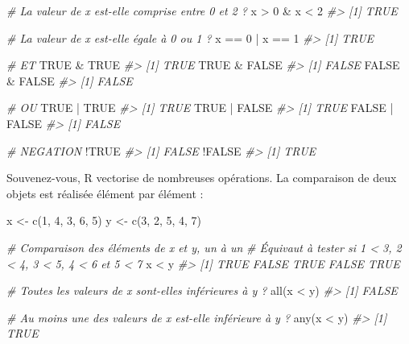 \documentclass[
  french,
]{scrbook}
\newenvironment{Shaded}{\begin{snugshade}}{\end{snugshade}}
\newcommand{\CommentTok}[1]{\textcolor[rgb]{0.56,0.35,0.01}{\textit{#1}}}
\newcommand{\ConstantTok}[1]{\textcolor[rgb]{0.00,0.00,0.00}{#1}}
\newcommand{\DecValTok}[1]{\textcolor[rgb]{0.00,0.00,0.81}{#1}}
\newcommand{\FunctionTok}[1]{\textcolor[rgb]{0.00,0.00,0.00}{#1}}
\newcommand{\NormalTok}[1]{#1}
\newcommand{\OtherTok}[1]{\textcolor[rgb]{0.56,0.35,0.01}{#1}}
\newcommand{\SpecialCharTok}[1]{\textcolor[rgb]{0.00,0.00,0.00}{#1}}
\begin{document}
\begin{Shaded}
\begin{Highlighting}[]
\CommentTok{\# La valeur de x est{-}elle comprise entre 0 et 2 ?}
\NormalTok{x }\SpecialCharTok{\textgreater{}} \DecValTok{0} \SpecialCharTok{\&}\NormalTok{ x }\SpecialCharTok{\textless{}} \DecValTok{2}
\CommentTok{\#\textgreater{} [1] TRUE}

\CommentTok{\# La valeur de x est{-}elle égale à 0 ou 1 ?}
\NormalTok{x }\SpecialCharTok{==} \DecValTok{0} \SpecialCharTok{|}\NormalTok{ x }\SpecialCharTok{==} \DecValTok{1}
\CommentTok{\#\textgreater{} [1] TRUE}

\CommentTok{\# ET}
\ConstantTok{TRUE} \SpecialCharTok{\&} \ConstantTok{TRUE}
\CommentTok{\#\textgreater{} [1] TRUE}
\ConstantTok{TRUE} \SpecialCharTok{\&} \ConstantTok{FALSE}
\CommentTok{\#\textgreater{} [1] FALSE}
\ConstantTok{FALSE} \SpecialCharTok{\&} \ConstantTok{FALSE}
\CommentTok{\#\textgreater{} [1] FALSE}

\CommentTok{\# OU}
\ConstantTok{TRUE} \SpecialCharTok{|} \ConstantTok{TRUE}
\CommentTok{\#\textgreater{} [1] TRUE}
\ConstantTok{TRUE} \SpecialCharTok{|} \ConstantTok{FALSE}
\CommentTok{\#\textgreater{} [1] TRUE}
\ConstantTok{FALSE} \SpecialCharTok{|} \ConstantTok{FALSE}
\CommentTok{\#\textgreater{} [1] FALSE}

\CommentTok{\# NEGATION}
\SpecialCharTok{!}\ConstantTok{TRUE}
\CommentTok{\#\textgreater{} [1] FALSE}
\SpecialCharTok{!}\ConstantTok{FALSE}
\CommentTok{\#\textgreater{} [1] TRUE}
\end{Highlighting}
\end{Shaded}

Souvenez-vous, R vectorise de nombreuses opérations. La comparaison de deux objets est réalisée élément par élément :

\begin{Shaded}
\begin{Highlighting}[]
\NormalTok{x }\OtherTok{\textless{}{-}} \FunctionTok{c}\NormalTok{(}\DecValTok{1}\NormalTok{, }\DecValTok{4}\NormalTok{, }\DecValTok{3}\NormalTok{, }\DecValTok{6}\NormalTok{, }\DecValTok{5}\NormalTok{)}
\NormalTok{y }\OtherTok{\textless{}{-}} \FunctionTok{c}\NormalTok{(}\DecValTok{3}\NormalTok{, }\DecValTok{2}\NormalTok{, }\DecValTok{5}\NormalTok{, }\DecValTok{4}\NormalTok{, }\DecValTok{7}\NormalTok{)}

\CommentTok{\# Comparaison des éléments de x et y, un à un}
\CommentTok{\# Équivaut à tester si 1 \textless{} 3, 2 \textless{} 4, 3 \textless{} 5, 4 \textless{} 6 et 5 \textless{} 7}
\NormalTok{x }\SpecialCharTok{\textless{}}\NormalTok{ y}
\CommentTok{\#\textgreater{} [1]  TRUE FALSE  TRUE FALSE  TRUE}

\CommentTok{\# Toutes les valeurs de x sont{-}elles inférieures à y ?}
\FunctionTok{all}\NormalTok{(x }\SpecialCharTok{\textless{}}\NormalTok{ y)}
\CommentTok{\#\textgreater{} [1] FALSE}

\CommentTok{\# Au moins une des valeurs de x est{-}elle inférieure à y ?}
\FunctionTok{any}\NormalTok{(x }\SpecialCharTok{\textless{}}\NormalTok{ y)}
\CommentTok{\#\textgreater{} [1] TRUE}
\end{Highlighting}
\end{Shaded}
\end{document}

